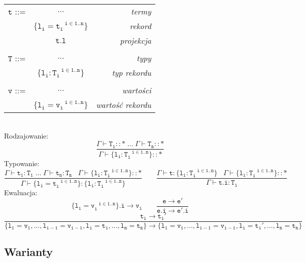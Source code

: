 \documentclass[11pt,leqno]{article}
\begin{document}
\begin{tabular}{| l c r |}
  \hline
  $\mathtt{t}$ ::= & $\dots$ & \textit{termy}  \\
   & $\mathtt{\{l_i=t_i^{\;\;\;i \in 1..n}\}}$ & \textit{rekord} \\
   & $\mathtt{t.l}$ & \textit{projekcja} \\ 
   & & \\
  $\mathtt{T}$ ::= & $\dots$ & \textit{typy}  \\
   & $\mathtt{\{l_i:T_i^{\;\;\;i \in 1..n}\}}$ & \textit{typ rekordu} \\
   & & \\
  $\mathtt{v}$ ::= & $\dots$ & \textit{wartości}  \\
   & $\mathtt{\{l_i=v_i^{\;\;\;i \in 1..n}\}}$ & \textit{wartość rekordu} \\
  \hline
\end{tabular} \\
Rodzajowanie: \\
 	\[\mathtt{
             \frac{\Gamma \vdash T_1::\ast \;\dots\;\Gamma \vdash T_n::\ast}{\Gamma \vdash \{l_i:T_i^{\;\;\;i \in 1..n}\}::\ast}
		}
	\]
Typowanie:
 	\[\mathtt{
             \frac{\Gamma \vdash t_1:T_1 \;\dots\;\Gamma \vdash t_n:T_n \;\;\; \Gamma \vdash \{l_i:T_i^{\;\;\;i \in 1..n}\}::\ast}{\Gamma \vdash \{l_i=t_i^{\;\;\;i \in 1..n}\}:\{l_i:T_i^{\;\;\;i \in 1..n}\}}
           \qquad
           \frac{\Gamma \vdash t : \{l_i:T_i^{\;\;\;i \in 1..n}\} \;\;\; \Gamma \vdash \{l_i:T_i^{\;\;\;i \in 1..n}\}::\ast}{\Gamma \vdash t.i : T_i} 
            }
	\]
Ewaluacja: \\
 	\[\mathtt{
                \{l_i=v_i^{\;\;\;i \in 1..n}\}.i \longrightarrow v_i
                \qquad
                \frac{e \longrightarrow e'}{e.i \longrightarrow e'.i}
		}
	\]
 	\[\mathtt{
                \frac{t_i \longrightarrow t_i'}{\{l_1=v_1, \dots, l_{i-1}=v_{i-1}, l_i=t_i, \dots, l_n=t_n\} \longrightarrow \{l_1=v_1, \dots, l_{i-1}=v_{i-1}, l_i=t_i', \dots, l_n=t_n\}}
		}
	\]

\subsection{Warianty}
\end{document}
